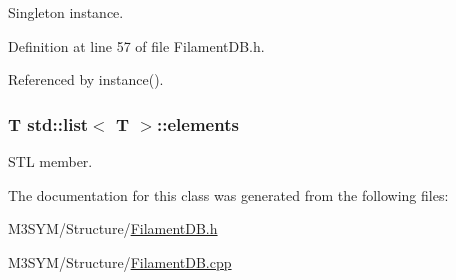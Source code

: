 Singleton instance. 



Definition at line 57 of file Filament\+D\+B.\+h.



Referenced by instance().

\hypertarget{classstd_1_1list_a682e5c7c91eb377d0cb4f019b2b81a5d}{
\subsubsection[{elements}]{\setlength{\rightskip}{0pt plus 5cm}T std\+::list$<$ T $>$\+::elements\hspace{0.3cm}{\ttfamily [inherited]}}}\label{classstd_1_1list_a682e5c7c91eb377d0cb4f019b2b81a5d}


S\+T\+L member. 



The documentation for this class was generated from the following files\+:\begin{DoxyCompactItemize}
\item 
M3\+S\+Y\+M/\+Structure/\hyperlink{FilamentDB_8h}{Filament\+D\+B.\+h}\item 
M3\+S\+Y\+M/\+Structure/\hyperlink{FilamentDB_8cpp}{Filament\+D\+B.\+cpp}\end{DoxyCompactItemize}
